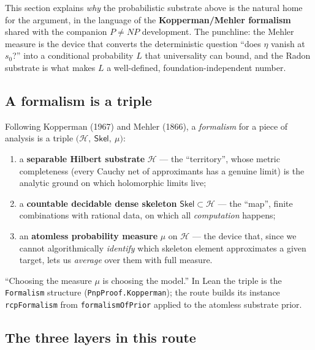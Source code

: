 \documentclass[11pt,a4paper]{article}
\theoremstyle{definition}
\begin{document}
This section explains \emph{why} the probabilistic substrate above is the natural home for
the argument, in the language of the \textbf{Kopperman/Mehler formalism} shared with the
companion \(P\neq NP\) development. The punchline: the Mehler measure is the device that
converts the deterministic question ``does \(\eta\) vanish at \(s_0\)?'' into a conditional
probability \(L\) that universality can bound, and the Radon substrate is what makes \(L\)
a well-defined, foundation-independent number.

\subsection{A formalism is a triple}\label{sec:triple}

Following Kopperman (1967) and Mehler (1866), a \emph{formalism} for a piece of analysis is
a triple \(\bigl(\mathcal{H},\ \mathsf{Skel},\ \mu\bigr)\):
\begin{enumerate}
  \item a \textbf{separable Hilbert substrate} \(\mathcal{H}\) --- the ``territory'', whose
        metric completeness (every Cauchy net of approximants has a genuine limit) is the
        analytic ground on which holomorphic limits live;
  \item a \textbf{countable decidable dense skeleton} \(\mathsf{Skel}\subset\mathcal{H}\) ---
        the ``map'', finite combinations with rational data, on which all \emph{computation}
        happens;
  \item an \textbf{atomless probability measure} \(\mu\) on \(\mathcal{H}\) --- the device
        that, since we cannot algorithmically \emph{identify} which skeleton element
        approximates a given target, lets us \emph{average} over them with full measure.
\end{enumerate}
``Choosing the measure \(\mu\) is choosing the model.'' In Lean the triple is the
\texttt{Formalism} structure (\texttt{PnpProof.Kopperman}); the route builds its instance
\texttt{rcpFormalism} from \texttt{formalismOfPrior} applied to the atomless substrate prior.

\subsection{The three layers in this route}\label{sec:layers}
\end{document}
